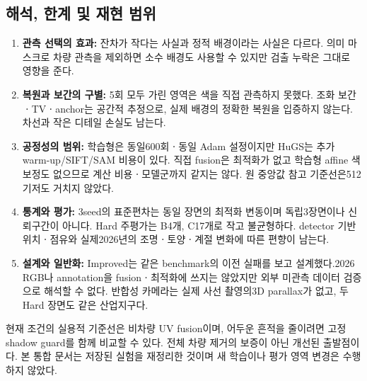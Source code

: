 \documentclass[11pt,a4paper]{article}
\begin{document}
\subsection{해석, 한계 및 재현 범위}
\begin{enumerate}
\item \textbf{관측 선택의 효과:} 잔차가 작다는 사실과 정적 배경이라는 사실은 다르다. 의미 마스크로 차량 관측을 제외하면 소수 배경도 사용할 수 있지만 검출 누락은 그대로 영향을 준다.
\item \textbf{복원과 보간의 구별:} 5회 모두 가린 영역은 색을 직접 관측하지 못했다. 조화 보간ㆍTVㆍanchor는 공간적 추정으로, 실제 배경의 정확한 복원을 입증하지 않는다. 차선과 작은 디테일 손실도 남는다.
\item \textbf{공정성의 범위:} 학습형은 동일600회ㆍ동일 Adam 설정이지만 HuGS는 추가 warm-up/SIFT/SAM 비용이 있다. 직접 fusion은 최적화가 없고 학습형 affine 색보정도 없으므로 계산 비용ㆍ모델군까지 같지는 않다. 원 중앙값 참고 기준선은512기저도 거치지 않았다.
\item \textbf{통계와 평가:} 3seed의 표준편차는 동일 장면의 최적화 변동이며 독립3장면이나 신뢰구간이 아니다. Hard 주평가는 B4개, C17개로 작고 불균형하다. detector 기반 위치ㆍ점유와 실제2026년의 조명ㆍ토양ㆍ계절 변화에 따른 편향이 남는다.
\item \textbf{설계와 일반화:} Improved는 같은 benchmark의 이전 실패를 보고 설계했다.2026 RGB나 annotation을 fusionㆍ최적화에 쓰지는 않았지만 외부 미관측 데이터 검증으로 해석할 수 없다. 반합성 카메라는 실제 사선 촬영의3D parallax가 없고, 두 Hard 장면도 같은 산업지구다.
\end{enumerate}

현재 조건의 실용적 기준선은 비차량 UV fusion이며, 어두운 흔적을 줄이려면 고정 shadow guard를 함께 비교할 수 있다. 전체 차량 제거의 보증이 아닌 개선된 출발점이다. 본 통합 문서는 저장된 실험을 재정리한 것이며 새 학습이나 평가 영역 변경은 수행하지 않았다.
\end{document}
